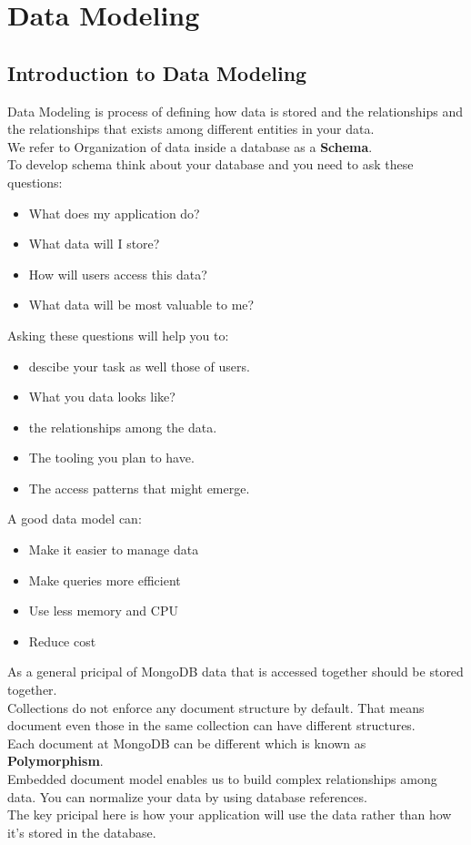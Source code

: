 \documentclass[../main.tex]{subfiles}
\begin{document}
\chapter{Data Modeling}
\section{Introduction to Data Modeling}
Data Modeling is process of defining how data is stored and the relationships and the relationships that exists among different entities in your data. \\ 
We refer to Organization of data inside a database as a \textbf{Schema}. \\ 
To develop schema think about your database and you need to ask these questions:
\begin{itemize}
	\item{What does my application do?}
	\item{What data will I store?}
	\item{How will users access this data?}
	\item{What data will be most valuable to me?}
\end{itemize}

Asking these questions will help you to:
\begin{itemize}
	\item{descibe your task as well those of users. }
	\item{What you data looks like?}
	\item{the relationships among the data.}
	\item{The tooling you plan to have.}
	\item{The access patterns that might emerge.}
\end{itemize}

\medskip
A good data model can: 
\begin{itemize}
	\item{Make it easier to manage data}
	\item{Make queries more efficient}
	\item{Use less memory and \gls{CPU}}
	\item{Reduce cost}
\end{itemize}

As a general pricipal of MongoDB data that is accessed together should be stored together. \\ 
Collections do not enforce any document structure by default. That means document even those in the same collection can have different structures. \\
Each document at MongoDB can be different which is known as \textbf{Polymorphism}. \\ 
Embedded document model enables us to build complex relationships among data. You can normalize your data by using database references. \\ 
The key pricipal here is how your application will use the data rather than how it's stored in the database.
\end{document}
